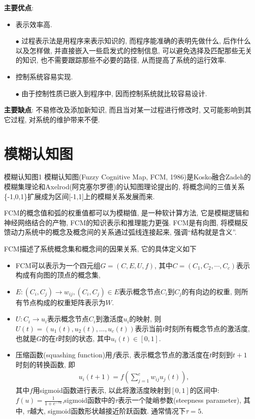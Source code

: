 \textbf{主要优点}: 
\begin{itemize}
\item  表示效率高.
    
    $\bullet$ 过程表示法是用程序来表示知识的, 而程序能准确的表明先做什么, 后作什么以及怎样做, 并直接嵌入一些启发式的控制信息, 可以避免选择及匹配那些无关的知识, 也不需要跟踪那些不必要的路径, 从而提高了系统的运行效率.
\item  控制系统容易实现.

    $\bullet$ 由于控制性质已嵌入到程序中, 因而控制系统就比较容易设计.
\end{itemize}

\textbf{主要缺点}: 不易修改及添加新知识, 而且当对某一过程进行修改时, 又可能影响到其它过程, 对系统的维护带来不便.
\section{模糊认知图}
\begin{mydef}{模糊认知图}{1}
模糊认知图(Fuzzy Cognitive Map, FCM, 1986)是Kosko融合Zadeh的模糊集理论和Axelrod(阿克塞尔罗德)的认知图理论提出的, 将概念间的三值关系\{-1,0,1\}扩展成为区间[-1,1]上的模糊关系发展而来.
\end{mydef}

FCM的\textcolor[rgb]{0,0,1}{概念值}和弧的权重值都可以为模糊值, 是一种软计算方法, 它是模糊逻辑和神经网络结合的产物, FCM的知识表示和推理能力更强.
FCM是有向图, 将模糊反馈动力系统中的概念及概念间的关系通过弧线连接起来, 强调“结构就是含义”.

FCM描述了系统概念集和概念间的因果关系, 它的具体定义如下
\begin{itemize}
\item FCM可以表示为一个四元组$G=(C,E,U,f)$, 其中$C=(C_1,C_2,\cdots, C_c)$表示构成有向图的顶点的概念集,
\item $E:\left(C_{i}, C_{j}\right) \rightarrow w_{i j}, (C_{i}, C_{j})\in E$​表示概念节点$C_i$​到$C_j$​的有向边的权重, 则所有节点构成的权重矩阵表示为$W$.
\item $U: C_{i} \rightarrow u_{i}$​表示概念节点$C_i$​到激活度$u_i$​的映射, 则$U(t)=\left(u_{1}(t), u_{2}(t), \dots, u_{c}(t)\right)$表示当前$t$时刻所有概念节点的激活度, 也就是$G$的在$t$时刻的状态, 其中$u_{i}(t) \in[0,1]$.
\item 压缩函数(squashing function)用$f$表示, 表示概念节点的激活度在$t$时刻到$t+1$时刻的转换函数, 即
\begin{align}
    u_{i}(t+1)=f\left(\sum_{j=1}^{c} w_{i j} u_{j}(t)\right),
\end{align}
其中$f$用sigmoid函数进行表示, 以此将激活度映射到$[0,1]$的区间中: $f(u)=\frac{1}{1+e^{-\tau u}}$, ​sigmoid函数中的$\tau$表示一个陡峭参数(steepness parameter), 其中, $\tau$越大, sigmoid函数形状越接近阶跃函数. 通常情况下$\tau=5$.
\end{itemize}

